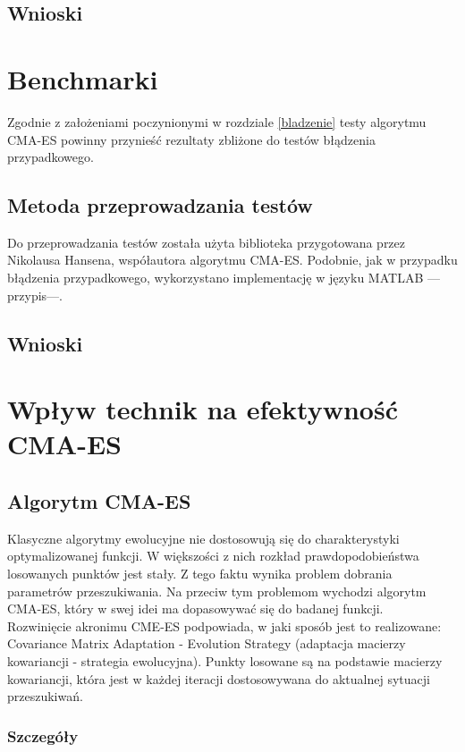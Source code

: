 \documentclass{mini}
\begin{document}
\subsection{Wnioski}

\pagebreak

\section{Benchmarki}
Zgodnie z założeniami poczynionymi w rozdziale \ref{bladzenie} testy algorytmu CMA-ES powinny przynieść rezultaty zbliżone do testów błądzenia przypadkowego.

\subsection{Metoda przeprowadzania testów}
Do przeprowadzania testów została użyta biblioteka przygotowana przez Nikolausa Hansena, współautora algorytmu CMA-ES. Podobnie, jak w przypadku błądzenia przypadkowego, wykorzystano implementację w języku MATLAB ---przypis---.

\subsection{Wnioski}

\pagebreak

\section{Wpływ technik na efektywność CMA-ES}

\subsection{Algorytm CMA-ES}
Klasyczne algorytmy ewolucyjne nie dostosowują się do charakterystyki optymalizowanej funkcji. W większości z nich rozkład prawdopodobieństwa losowanych punktów jest stały. Z tego faktu wynika problem dobrania parametrów przeszukiwania. Na przeciw tym problemom wychodzi algorytm CMA-ES, który w swej idei ma dopasowywać się do badanej funkcji.\\
Rozwinięcie akronimu CME-ES podpowiada, w jaki sposób jest to realizowane: Covariance Matrix Adaptation - Evolution Strategy (adaptacja macierzy kowariancji - strategia ewolucyjna). Punkty losowane są na podstawie macierzy kowariancji, która jest w każdej iteracji dostosowywana do aktualnej sytuacji przeszukiwań.

\subsubsection*{Szczegóły}
\end{document}
